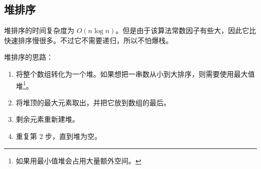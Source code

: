 \subsection{堆排序}
	堆排序的时间复杂度为 $O(n\log n)$。但是由于该算法常数因子有些大，因此它比快速排序慢很多。不过它不需要递归，所以不怕爆栈。
	
	堆排序的思路：
	
	\begin{enumerate}
		\item 将整个数组转化为一个堆。如果想把一串数从小到大排序，则需要使用最大值堆\footnote{如果用最小值堆会占用大量额外空间。}。
		\item 将堆顶的最大元素取出，并把它放到数组的最后。
		\item 剩余元素重新建堆。
		\item 重复第 2 步，直到堆为空。
	\end{enumerate}